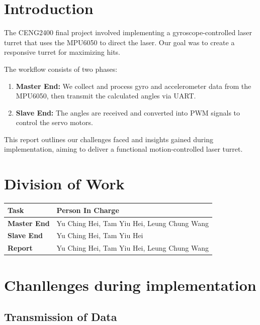 \documentclass[12pt, a4paper]{article}
\begin{document}
\section{Introduction}
The CENG2400 final project involved implementing a gyroscope-controlled laser turret 
that uses the MPU6050 to direct the laser. Our goal was to create a responsive turret for maximizing hits.

\noindent The workflow consists of two phases:
\begin{enumerate}
    \item \textbf{Master End:} We collect and process gyro and accelerometer 
          data from the \\MPU6050, then transmit the calculated angles via UART.
    \item \textbf{Slave End:} The angles are received and converted into PWM 
          signals to control the servo motors.
\end{enumerate}
This report outlines our challenges faced and insights gained during implementation, aiming to deliver a functional motion-controlled laser turret.

\section{Division of Work}
\begin{tabularx}{\textwidth}{|l||X|}
    \hline
    \textbf{Task} & \textbf{Person In Charge} \\
    \hline\hline
    \textbf{Master End} & Yu Ching Hei, Tam Yiu Hei, Leung Chung Wang \\
    \hline
    \textbf{Slave End} & Yu Ching Hei, Tam Yiu Hei \\
    \hline
    \textbf{Report} & Yu Ching Hei, Tam Yiu Hei, Leung Chung Wang \\
    \hline
\end{tabularx}

\section{Chanllenges during implementation}
\subsection{Transmission of Data}
\end{document}
